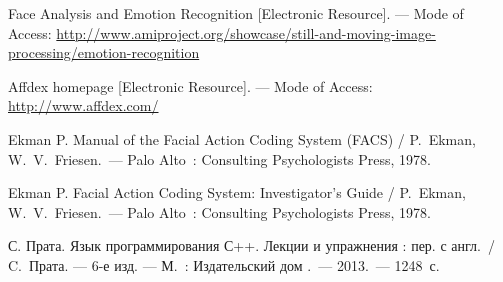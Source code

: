 \begin{thebibliography}
	 Face Analysis and Emotion Recognition [Electronic Resource]. --- Mode of Access: 
\url{http://www.amiproject.org/showcase/still-and-moving-image-processing/emotion-recognition}

	 Affdex homepage [Electronic Resource]. --- Mode of Access:
\url{http://www.affdex.com/} 

	 Ekman P. Manual of the Facial Action Coding System (FACS) / P.~Ekman, W.~V.~Friesen.~--- Palo Alto~: Consulting Psychologists Press, 1978.
	
	 Ekman P. Facial Action Coding System: Investigator’s Guide / P.~Ekman, W.~V.~Friesen.~--- Palo Alto~: Consulting Psychologists Press, 1978.

	 С. Прата. Язык программирования С++. Лекции и упражнения : пер. с англ.~/ C.~Прата. --- 6-е изд. --- М.~: Издательский дом .~--- 2013.~--- 1248~с.
\end{thebibliography}
